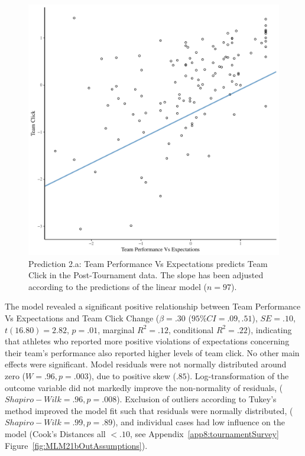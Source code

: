 \begin{CJK}{UTF8}{gbsn}
  \begin{figure}[htbp]
    \centering
  \includegraphics[scale=.5]{images/teamPerfClickModelSlope.pdf}
    \caption{Prediction 2.a: Team Performance Vs Expectations predicts Team Click in the Post-Tournament data. The slope has been adjusted according to the predictions of the linear model ($n = 97$).}
    \label{fig:teamPerfClickModelSlope}
  \end{figure}





The model revealed a significant positive relationship between Team Performance Vs Expectations and Team Click Change ($\beta = .30$ ($95\% CI =  .09, .51$), $SE = .10$, $t(16.80) = 2.82$, $p = .01$, marginal $R^2 = .12$, conditional $R^2 = .22$), indicating that athletes who reported more positive violations of expectations concerning their team's performance also reported higher levels of team click.  No other main effects were significant.  Model residuals were not normally distributed around zero ($W = .96, p = .003$), due to positive skew ($.85$).  Log-transformation of the outcome variable did not markedly improve the non-normality of residuals, ($Shapiro-Wilk = .96, p = .008$). Exclusion of outliers according to Tukey's method improved the model fit such that residuals were normally distributed, ($Shapiro-Wilk = .99, p = .89$), and individual cases had low influence on the model (Cook's Distances all $< .10$, see Appendix~\ref{app8:tournamentSurvey} Figure~\ref{fig:MLM21bOutAssumptions}).


\end{CJK}
